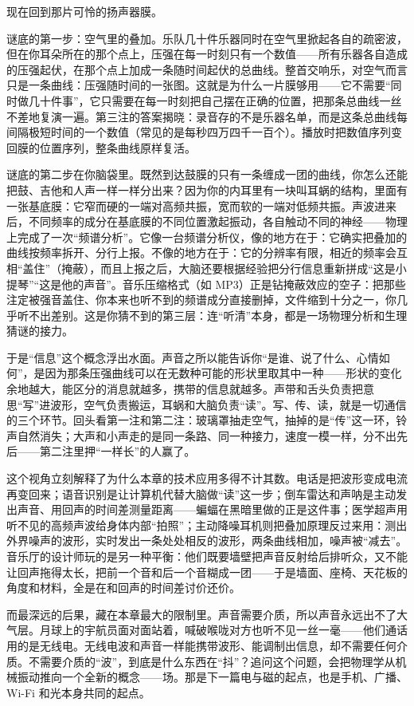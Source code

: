 
\begin{mainline}
现在回到那片可怜的扬声器膜。

谜底的第一步：空气里的叠加。乐队几十件乐器同时在空气里掀起各自的疏密波，但在你耳朵所在的那个点上，压强在每一时刻只有一个数值——所有乐器各自造成的压强起伏，在那个点上加成一条随时间起伏的总曲线。整首交响乐，对空气而言只是一条曲线：压强随时间的一张图。这就是为什么一片膜够用——它不需要“同时做几十件事”，它只需要在每一时刻把自己摆在正确的位置，把那条总曲线一丝不差地复演一遍。第三注的答案揭晓：录音存的不是乐器名单，而是这条总曲线每间隔极短时间的一个数值（常见的是每秒四万四千一百个）。播放时把数值序列变回膜的位置序列，整条曲线原样复活。

谜底的第二步在你脑袋里。既然到达鼓膜的只有一条缠成一团的曲线，你怎么还能把鼓、吉他和人声一样一样分出来？因为你的内耳里有一块叫耳蜗的结构，里面有一张基底膜：它窄而硬的一端对高频共振，宽而软的一端对低频共振。声波进来后，不同频率的成分在基底膜的不同位置激起振动，各自触动不同的神经——物理上完成了一次“频谱分析”。它像一台频谱分析仪，像的地方在于：它确实把叠加的曲线按频率拆开、分行上报。不像的地方在于：它的分辨率有限，相近的频率会互相“盖住”（掩蔽），而且上报之后，大脑还要根据经验把分行信息重新拼成“这是小提琴”“这是他的声音”。音乐压缩格式（如 MP3）正是钻掩蔽效应的空子：把那些注定被强音盖住、你本来也听不到的频谱成分直接删掉，文件缩到十分之一，你几乎听不出差别。这是你猜不到的第三层：连“听清”本身，都是一场物理分析和生理猜谜的接力。

于是“信息”这个概念浮出水面。声音之所以能告诉你“是谁、说了什么、心情如何”，是因为那条压强曲线可以在无数种可能的形状里取其中一种——形状的变化余地越大，能区分的消息就越多，携带的信息就越多。声带和舌头负责把意思“写”进波形，空气负责搬运，耳蜗和大脑负责“读”。写、传、读，就是一切通信的三个环节。回头看第一注和第二注：玻璃罩抽走空气，抽掉的是“传”这一环，铃声自然消失；大声和小声走的是同一条路、同一种接力，速度一模一样，分不出先后——第二注里押“一样长”的人赢了。

这个视角立刻解释了为什么本章的技术应用多得不计其数。电话是把波形变成电流再变回来；语音识别是让计算机代替大脑做“读”这一步；倒车雷达和声呐是主动发出声音、用回声的时间差测量距离——蝙蝠在黑暗里做的正是这件事；医学超声用听不见的高频声波给身体内部“拍照”；主动降噪耳机则把叠加原理反过来用：测出外界噪声的波形，实时发出一条处处相反的波形，两条曲线相加，噪声被“减去”。音乐厅的设计师玩的是另一种平衡：他们既要墙壁把声音反射给后排听众，又不能让回声拖得太长，把前一个音和后一个音糊成一团——于是墙面、座椅、天花板的角度和材料，全是在和回声的时间差讨价还价。

而最深远的后果，藏在本章最大的限制里。声音需要介质，所以声音永远出不了大气层。月球上的宇航员面对面站着，喊破喉咙对方也听不见一丝一毫——他们通话用的是无线电。无线电波和声音一样能携带波形、能调制出信息，却不需要任何介质。不需要介质的“波”，到底是什么东西在“抖”？追问这个问题，会把物理学从机械振动推向一个全新的概念——场。那是下一篇电与磁的起点，也是手机、广播、Wi-Fi 和光本身共同的起点。
\end{mainline}

